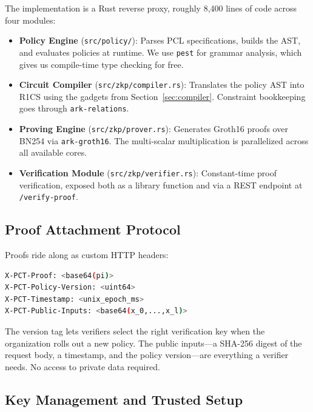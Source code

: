 \documentclass[10pt,conference]{IEEEtran}
\begin{document}
The implementation is a Rust reverse proxy, roughly 8,400 lines of code across four modules:

\begin{itemize}
    \item \textbf{Policy Engine} (\texttt{src/policy/}): Parses PCL specifications, builds the AST, and evaluates policies at runtime. We use \texttt{pest} for grammar analysis, which gives us compile-time type checking for free.

    \item \textbf{Circuit Compiler} (\texttt{src/zkp/compiler.rs}): Translates the policy AST into R1CS using the gadgets from Section~\ref{sec:compiler}. Constraint bookkeeping goes through \texttt{ark-relations}.

    \item \textbf{Proving Engine} (\texttt{src/zkp/prover.rs}): Generates Groth16 proofs over BN254 via \texttt{ark-groth16}. The multi-scalar multiplication is parallelized across all available cores.

    \item \textbf{Verification Module} (\texttt{src/zkp/verifier.rs}): Constant-time proof verification, exposed both as a library function and via a REST endpoint at \texttt{/verify-proof}.
\end{itemize}

\subsection{Proof Attachment Protocol}

Proofs ride along as custom HTTP headers:

\begin{lstlisting}[language=bash, caption={PCT header format.}]
X-PCT-Proof: <base64(pi)>
X-PCT-Policy-Version: <uint64>
X-PCT-Timestamp: <unix_epoch_ms>
X-PCT-Public-Inputs: <base64(x_0,...,x_l)>
\end{lstlisting}

The version tag lets verifiers select the right verification key when the organization rolls out a new policy. The public inputs---a SHA-256 digest of the request body, a timestamp, and the policy version---are everything a verifier needs. No access to private data required.

\subsection{Key Management and Trusted Setup}
\end{document}
